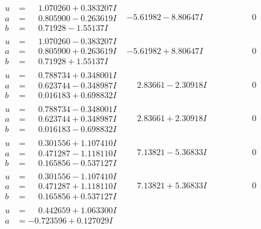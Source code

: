 \documentclass[1p]{elsarticle_modified}
\theoremstyle{definition}
\begin{document}
$$\begin{array}{c|c|c}
\begin{aligned}
u &= \phantom{-}1.070260 + 0.383207 I \\
a &= \phantom{-}0.805900 - 0.263619 I \\
b &= \phantom{-}0.71928 - 1.55137 I\end{aligned}
 & -5.61982 - 8.80647 I & \phantom{-0.000000 } 0 \\ \hline\begin{aligned}
u &= \phantom{-}1.070260 - 0.383207 I \\
a &= \phantom{-}0.805900 + 0.263619 I \\
b &= \phantom{-}0.71928 + 1.55137 I\end{aligned}
 & -5.61982 + 8.80647 I & \phantom{-0.000000 } 0 \\ \hline\begin{aligned}
u &= \phantom{-}0.788734 + 0.348001 I \\
a &= \phantom{-}0.623744 - 0.348987 I \\
b &= \phantom{-}0.016183 + 0.698832 I\end{aligned}
 & \phantom{-}2.83661 - 2.30918 I & \phantom{-0.000000 } 0 \\ \hline\begin{aligned}
u &= \phantom{-}0.788734 - 0.348001 I \\
a &= \phantom{-}0.623744 + 0.348987 I \\
b &= \phantom{-}0.016183 - 0.698832 I\end{aligned}
 & \phantom{-}2.83661 + 2.30918 I & \phantom{-0.000000 } 0 \\ \hline\begin{aligned}
u &= \phantom{-}0.301556 + 1.107410 I \\
a &= \phantom{-}0.471287 - 1.118110 I \\
b &= \phantom{-}0.165856 - 0.537127 I\end{aligned}
 & \phantom{-}7.13821 - 5.36833 I & \phantom{-0.000000 } 0 \\ \hline\begin{aligned}
u &= \phantom{-}0.301556 - 1.107410 I \\
a &= \phantom{-}0.471287 + 1.118110 I \\
b &= \phantom{-}0.165856 + 0.537127 I\end{aligned}
 & \phantom{-}7.13821 + 5.36833 I & \phantom{-0.000000 } 0 \\ \hline\begin{aligned}
u &= \phantom{-}0.442659 + 1.063300 I \\
a &= -0.723596 + 0.127029 I \\

\end{aligned}
\end{array}$$
\end{document}
